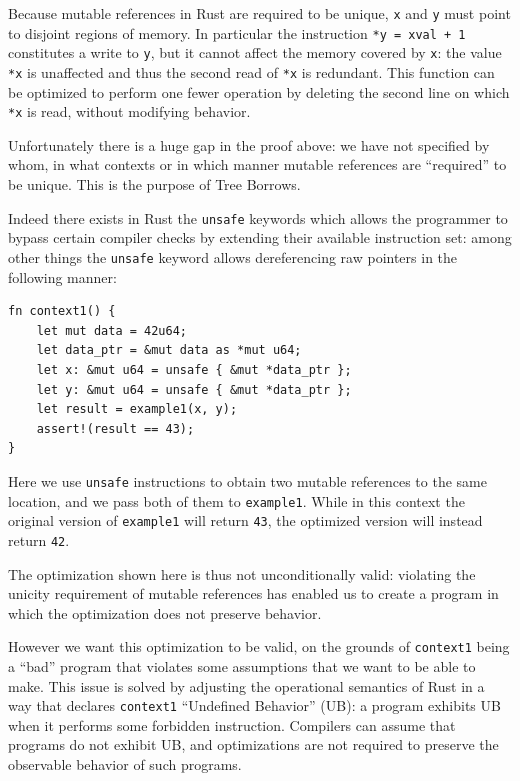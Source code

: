 \documentclass[a4paper,11pt]{article}
\theoremstyle{plain}
\theoremstyle{definition}
\theoremstyle{remark}
\newcommand{\tcode}[1]{\texttt{#1}}
\begin{document}
Because mutable references in Rust are required to be unique, \tcode{x} and
\tcode{y} must point to disjoint regions of memory. In particular the
instruction \tcode{*y = xval + 1} constitutes a write to \tcode{y}, but it
cannot affect the memory covered by \tcode{x}: the value \tcode{*x} is unaffected
and thus the second read of \tcode{*x} is redundant. This function can be
optimized to perform one fewer operation by deleting the second line on which
\tcode{*x} is read, without modifying behavior.

Unfortunately there is a huge gap in the proof above: we have not specified
by whom, in what contexts or in which manner mutable references are ``required''
to be unique. This is the purpose of Tree Borrows.

Indeed there exists in Rust the \tcode{unsafe} keywords which
allows the programmer to bypass certain compiler checks by extending their
available instruction set: among other things the \tcode{unsafe} keyword allows
dereferencing raw pointers in the following manner:
\begin{lstlisting}
fn context1() {
    let mut data = 42u64;
    let data_ptr = &mut data as *mut u64;
    let x: &mut u64 = unsafe { &mut *data_ptr };
    let y: &mut u64 = unsafe { &mut *data_ptr };
    let result = example1(x, y);
    assert!(result == 43);
}
\end{lstlisting}
Here we use \tcode{unsafe} instructions to obtain two mutable references
to the same location, and we pass both of them to \tcode{example1}.
While in this context the original version of \tcode{example1} will return
\tcode{43}, the optimized version will instead return \tcode{42}.

The optimization shown here is thus not unconditionally valid: violating the
unicity requirement of mutable references has enabled us to create a program
in which the optimization does not preserve behavior.

However we want this optimization to be valid, on the grounds of \tcode{context1}
being a ``bad'' program that violates some assumptions that we want to be able
to make. This issue is solved by adjusting the operational semantics of Rust
in a way that declares \tcode{context1} ``Undefined Behavior'' (UB):
a program exhibits UB when it performs some forbidden instruction.
Compilers can assume that programs do not exhibit UB, and optimizations are
not required to preserve the observable behavior of such programs.
\end{document}
